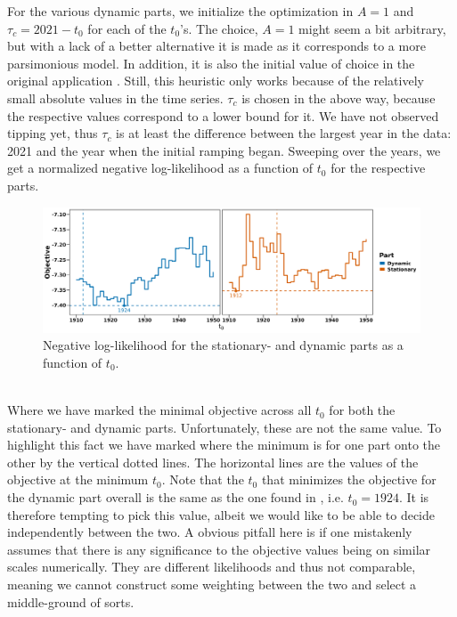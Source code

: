 For the various dynamic parts, we initialize the optimization in $A = 1$ and $\tau_c = 2021 - t_0$ for each of the $t_0$'s. The choice, $A = 1$ might seem a bit arbitrary, but with a lack of a better alternative it is made as it corresponds to a more parsimonious model. In addition, it is also the initial value of choice in the original application \cite{Ditlevsen2023}. Still, this heuristic only works because of the relatively small absolute values in the time series. $\tau_c$ is chosen in the above way, because the respective values correspond to a lower bound for it. We have not observed tipping yet, thus $\tau_c$ is at least the difference between the largest year in the data: 2021 and the year when the initial ramping began. Sweeping over the years, we get a normalized negative log-likelihood as a function of $t_0$ for the respective parts.
\begin{figure}[h!]
    \begin{center}
    \includegraphics[scale = .095]{figures/ramping_year_likelihood_plot.jpeg}
    \caption{Negative log-likelihood for the stationary- and dynamic parts as a function of $t_0$.}
    \label{figure:negLoglikRamping}        
    \end{center}
\end{figure}\\
Where we have marked the minimal objective across all $t_0$ for both the stationary- and dynamic parts. Unfortunately, these are not the same value. To highlight this fact we have marked where the minimum is for one part onto the other by the vertical dotted lines. The horizontal lines are the values of the objective at the minimum $t_0$. Note that the $t_0$ that minimizes the objective for the dynamic part overall is the same as the one found in \cite{Ditlevsen2023}, i.e. $t_0 = 1924$. It is therefore tempting to pick this value, albeit we would like to be able to decide independently between the two. A obvious pitfall here is if one mistakenly assumes that there is any significance to the objective values being on similar scales numerically. They are different likelihoods and thus not comparable, meaning we cannot construct some weighting between the two and select a middle-ground of sorts.

